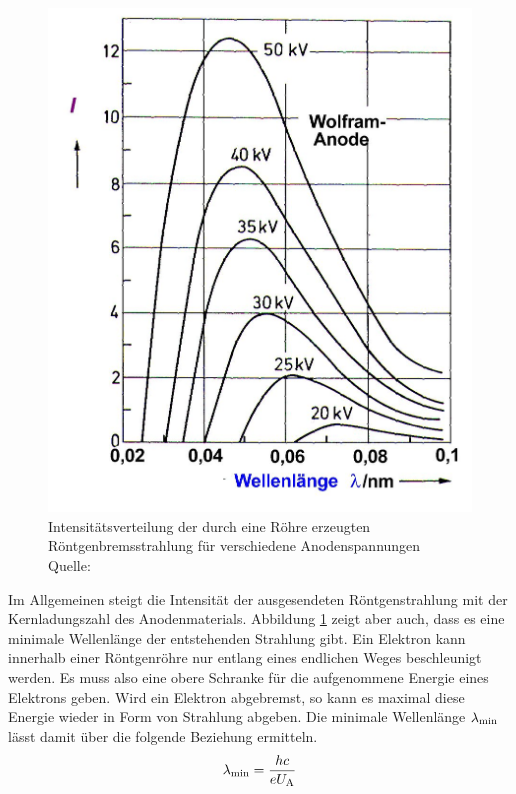 			\begin{figure}[htb]
				\centering
				\includegraphics[scale = 0.8]{images/bremsstrahlung.jpg}
				\caption{Intensitätsverteilung der durch eine Röhre erzeugten Röntgenbremsstrahlung für verschiedene Anodenspannungen \\ Quelle: }
				\label{fig:roehre-intensity}
			\end{figure}

			Im Allgemeinen steigt die Intensität der ausgesendeten Röntgenstrahlung mit der Kernladungszahl des Anodenmaterials.
			Abbildung \ref{fig:roehre-intensity} zeigt aber auch, dass es eine minimale Wellenlänge der entstehenden Strahlung gibt.
			Ein Elektron kann innerhalb einer Röntgenröhre nur entlang eines endlichen Weges beschleunigt werden.
			Es muss also eine obere Schranke für die aufgenommene Energie eines Elektrons geben.
			Wird ein Elektron abgebremst, so kann es maximal diese Energie wieder in Form von Strahlung abgeben.
			Die minimale Wellenlänge $\lambda_{\mathrm{min}}$ lässt damit über die folgende Beziehung ermitteln.
			\[ \lambda_{\mathrm{min}} = \frac{hc}{eU_{\mathrm{A}}} \]
		
